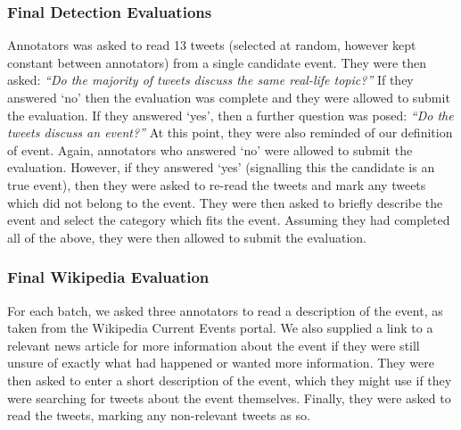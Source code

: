 \subsubsection{Final Detection Evaluations}
Annotators was asked to read 13 tweets (selected at random, however kept constant between annotators) from a single candidate event.
They were then asked: \emph{``Do the majority of tweets discuss the same real-life topic?''}
If they answered `no' then the evaluation was complete and they were allowed to submit the evaluation.
If they answered `yes', then a further question was posed:
\emph{``Do the tweets discuss an event?''} At this point, they were also reminded of our definition of event.
Again, annotators who answered `no' were allowed to submit the evaluation.
However, if they answered `yes' (signalling this the candidate is an true event), then they were asked to re-read the tweets and mark any tweets which did not belong to the event.
They were then asked to briefly describe the event and select the category which fits the event.
Assuming they had completed all of the above, they were then allowed to submit the evaluation.

\subsubsection{Final Wikipedia Evaluation}
For each batch, we asked three annotators to read a description of the event, as taken from the Wikipedia Current Events portal.
We also supplied a link to a relevant news article for more information about the event if they were still unsure of exactly what had happened or wanted more information.
They were then asked to enter a short description of the event, which they might use if they were searching for tweets about the event themselves.
Finally, they were asked to read the tweets, marking any non-relevant tweets as so.

